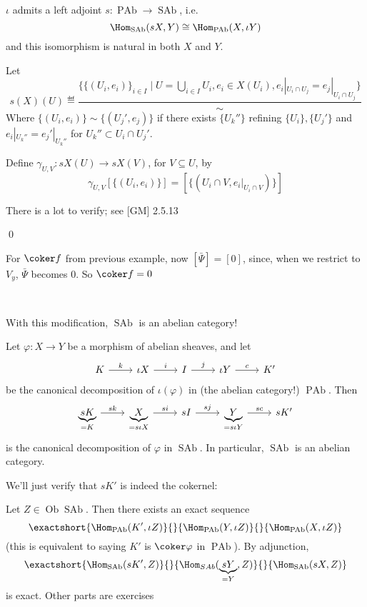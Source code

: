 \documentclass[x11names,reqno,14pt]{extarticle}
\DeclareMathOperator{\SAb}{SAb}
\DeclareMathOperator{\PAb}{PAb}
\DeclareMathOperator{\Ob}{Ob}
\begin{document}
\prop

$\iota$ admits a left adjoint $s:\PAb\to\SAb$, i.e. 
\[
\Hom_{\SAb}(sX, Y) \cong \Hom_{\PAb}(X, \iota Y)
\]
and this isomorphism is natural in both $X$ and $Y$.

\proof

Let 
\[
s(X)(U) \eqdef \frac{\{\{(U_i, e_i)\}_{i\in I} \mid U = \bigcup_{i\in I} U_i, e_i \in X(U_i), e_i|_{U_i \cap U_j} = e_j|_{U_i \cap U_j}\}}{\sim}
\]
Where $\{(U_i, e_i)\} \sim \{(U_j', e_j)\}$ if there exists $\{U_k''\}$ refining $\{U_i\}, \{U_j'\}$ and $e_i|_{U_k''} = e_j'|_{U_k''}$ for $U_k'' \subset U_i \cap U_j'$. 

Define $\gamma_{U,V}:sX(U)\to sX(V)$, for $V \subseteq U$, by 
\[
\gamma_{U,V}[\{(U_i,e_i)\}] = [\{(U_i \cap V, e_i|_{U_i \cap V})\}]
\]

There is a lot to verify; see [GM] 2.5.13

\qed

\exm

For $\coker f$ from previous example, now $[\bar{\Psi}] = [0]$, since, when we restrict to $V_y$, $\bar{\Psi}$ becomes 0. So $\coker f = 0$

\,

With this modification, $\SAb$ is an abelian category!

\prop

Let $\varphi:X\to Y$ be a morphism of abelian sheaves, and let 
\[
\begin{tikzcd}
K\ar[r, "k"] & \iota X \ar[r, "i"] & I \ar[r, "j"] & \iota Y \ar[r, "c"] & K'
\end{tikzcd}
\]
be the canonical decomposition of $\iota(\varphi)$ in (the abelian category!) $\PAb$. Then
\[
\begin{tikzcd}
\underbrace{sK}_{=K}\ar[r, "sk"] & \underbrace{X}_{= s\iota X} \ar[r, "si"] & sI \ar[r, "sj"] & \underbrace{Y}_{= s\iota Y} \ar[r, "sc"] & sK'
\end{tikzcd}
\]
is the canonical decomposition of $\varphi$ in $\SAb$. In particular, $\SAb$ is an abelian category. 

\proof

We'll just verify that $sK'$ is indeed the cokernel:

Let $Z\in \Ob\SAb$. Then there exists an exact sequence
\[
\exactshort{\Hom_{\PAb}(K',\iota Z)}{}{\Hom_{\PAb}(Y,\iota Z)}{}{\Hom_{\PAb}(X,\iota Z)}
\]
(this is equivalent to saying $K'$ is $\coker\varphi$ in $\PAb$). By adjunction,
\[
\exactshort{\Hom_{\SAb}(sK', Z)}{}{\Hom_{SAb}(\underbrace{sY}_{=Y}, Z)}{}{\Hom_{\SAb}(sX,Z)}
\]
is exact. Other parts are exercises
\end{document}
